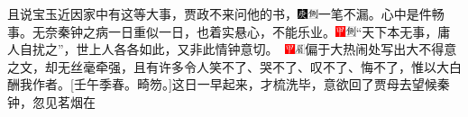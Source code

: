 {{{{{{{{{且说宝玉近因家中有这等大事，贾政不来问他的书，{\includegraphics[width=3mm]{../Images/00004}\includegraphics[width=3mm]{../Images/00011}\footnotesize \kaishu 一笔不漏。}心中是件畅事。无奈秦钟之病一日重似一日，也着实悬心，不能乐业。{\includegraphics[width=3mm]{../Images/00002}\includegraphics[width=3mm]{../Images/00011}\footnotesize \kaishu “天下本无事，庸人自扰之”，世上人各各如此，又非此情钟意切。　\includegraphics[width=3mm]{../Images/00002}\includegraphics[width=3mm]{../Images/00010}\footnotesize \kaishu 偏于大热闹处写出大不得意之文，却无丝毫牵强，且有许多令人笑不了、哭不了、叹不了、悔不了，惟以大白酬我作者。{[}壬午季春。畸笏。{]}}这日一早起来，才梳洗毕，意欲回了贾母去望候秦钟，忽见茗烟在}}}}}}}}}
